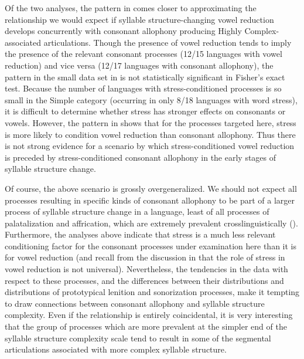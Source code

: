   Of the two analyses, the pattern in  comes closer to approximating the relationship we would expect if syllable structure-changing vowel reduction develops concurrently with consonant allophony producing Highly Complex-associated articulations. Though the presence of vowel reduction tends to imply the presence of the relevant consonant processes (12/15 languages with vowel reduction) and vice versa (12/17 languages with consonant allophony), the pattern in the small data set in  is not statistically significant in Fisher’s exact test. Because the number of languages with stress-conditioned processes is so small in the Simple category (occurring in only 8/18 languages with word stress), it is difficult to determine whether stress has stronger effects on consonants or vowels. However, the pattern in  shows that for the processes targeted here, stress is more likely to condition vowel reduction than consonant allophony. Thus there is not strong evidence for a scenario by which stress-conditioned vowel reduction is preceded by stress-conditioned consonant allophony in the early stages of syllable structure change.

  Of course, the above scenario is grossly overgeneralized. We should not expect all processes resulting in specific kinds of consonant allophony to be part of a larger process of syllable structure change in a language, least of all processes of palatalization and affrication, which are extremely prevalent crosslinguistically (\citealt{Bhat1978,Bateman2007}). Furthermore, the analyses above indicate that stress is a much less relevant conditioning factor for the consonant processes under examination here than it is for vowel reduction (and recall from the discussion in  that the role of stress in vowel reduction is not universal). Nevertheless, the tendencies in the data with respect to these processes, and the differences between their distributions and distributions of prototypical lenition and sonorization processes, make it tempting to draw connections between consonant allophony and syllable structure complexity. Even if the relationship is entirely coincidental, it is very interesting that the group of processes which are more prevalent at the simpler end of the syllable structure complexity scale tend to result in some of the segmental articulations associated with more complex syllable structure.

